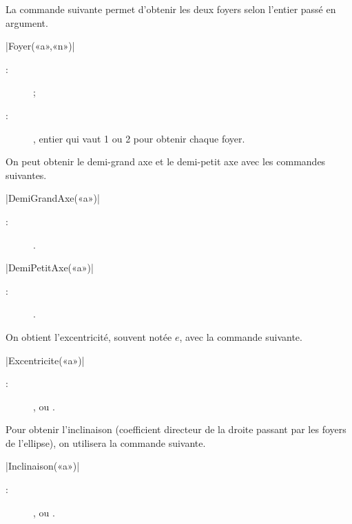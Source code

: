 \documentclass[a4paper,french]{article}
\begin{document}
La commande suivante permet d'obtenir les deux foyers selon l'entier passé en
argument.
\begin{colourband}
\macro|Foyer(«a»,«n»)|
\begin{description}
  \item[:]   ;
  \item[:] , entier qui vaut 1 ou 2 pour obtenir chaque
  foyer.
\end{description}
\end{colourband}
\bigskip

On peut obtenir le demi-grand axe et le demi-petit axe avec les commandes
suivantes.
\begin{colourband}
\macro|DemiGrandAxe(«a»)|
\begin{description}
  \item[:]  .
\end{description}
\end{colourband}
\bigskip


\begin{colourband}
\macro|DemiPetitAxe(«a»)|
\begin{description}
  \item[:]  .
\end{description}
\end{colourband}
\bigskip

On obtient l'excentricité, souvent notée $e$, avec la commande suivante.

\begin{colourband}
\macro|Excentricite(«a»)|
\begin{description}
  \item[:]  ,  ou .
\end{description}
\end{colourband}
\bigskip

Pour obtenir l'inclinaison (coefficient directeur de la droite passant par les
foyers de l'ellipse), on utilisera la commande suivante.

\begin{colourband}
\macro|Inclinaison(«a»)|
\begin{description}
  \item[:]  ,  ou .
\end{description}
\end{colourband}
\bigskip
\end{document}
